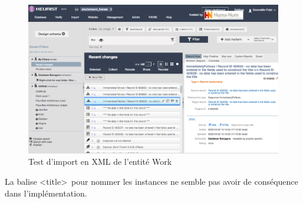 \documentclass[a4paper,12pt,twoside]{book}
\begin{document}
    \begin{figure}[!h]
    \centering
    \includegraphics[width=15cm]{img/Import_Donnees/ImportTestXMLRelation.png}
    \caption{Test d'import en XML de l'entité Work}
    \end{figure}
    \clearpage

La balise \textless title\textgreater~pour nommer les instances ne semble pas avoir de conséquence dans l'implémentation. \\
\end{document}
